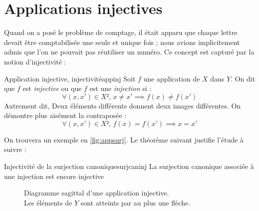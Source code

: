 \documentclass[a4paper,french,final]{memoir}
\begin{document}
  \section{Applications injectives}
  Quand on a posé le problème de comptage, il était apparu que chaque lettre devait être comptabilisée une seule et unique fois ; nous avions implicitement admis que l'on ne pouvait pas réutiliser un numéro. Ce concept est capturé par la notion d'injectivité :
  \begin{defb}{Application injective, injectivité}{appinj}
    Soit $f$ une application de $X$ dans $Y$.
    On dit que $f$ est \emph{injective} ou que $f$ est une \emph{injection} si  : \[\boxed{\forall (x,x') \in X²,\, x\neq x'\implies f(x)\neq f(x')}\]
    Autrement dit, Deux éléments différents donnent deux images différentes. On démontre plus aisément la contraposée :
    \[\boxed{\forall (x,x') \in X²,\, f(x)=f(x')\implies x=x'}\]
  \end{defb}
  On trouvera un exemple en \cref{fig:appsurj}. Le théorème suivant justifie l'étude à suivre :
  \begin{theoremb}{Injectivité de la surjection canonique}{surjcaninj}
La surjection canonique associée à une injection est encore injective
  \end{theoremb}
  	\begin{figure}[htbp]
	\centering
%
	\caption[Diagramme sagittal d'une application injective]{Diagramme sagittal d'une application injective.\\ Les éléments de $Y$ sont atteints par au plus une flèche.}
	\label{fig:appinj}
\end{figure}
\end{document}
